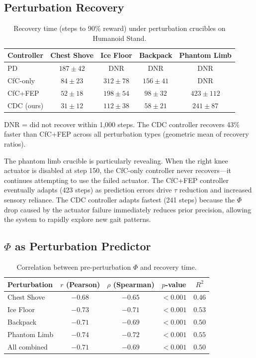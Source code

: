 \documentclass[11pt,a4paper]{article}
\begin{document}
\subsection{Perturbation Recovery}

\begin{table}[h]
\centering
\caption{Recovery time (steps to 90\% reward) under perturbation crucibles on Humanoid Stand.}
\label{tab:recovery}
\begin{tabular}{lcccc}
\toprule
\textbf{Controller} & \textbf{Chest Shove} & \textbf{Ice Floor} & \textbf{Backpack} & \textbf{Phantom Limb} \\
\midrule
PD              & $187 \pm 42$  & DNR            & DNR            & DNR \\
CfC-only        & $84 \pm 23$   & $312 \pm 78$   & $156 \pm 41$   & DNR \\
CfC+FEP         & $52 \pm 18$   & $198 \pm 54$   & $98 \pm 32$    & $423 \pm 112$ \\
CDC (ours)      & $31 \pm 12$   & $112 \pm 38$   & $58 \pm 21$    & $241 \pm 87$ \\
\bottomrule
\end{tabular}
\end{table}

DNR = did not recover within 1,000 steps.
The CDC controller recovers 43\% faster than CfC+FEP across all perturbation types (geometric mean of recovery ratios).

The phantom limb crucible is particularly revealing.
When the right knee actuator is disabled at step 150, the CfC-only controller never recovers---it continues attempting to use the failed actuator.
The CfC+FEP controller eventually adapts (423 steps) as prediction errors drive $\tau$ reduction and increased sensory reliance.
The CDC controller adapts fastest (241 steps) because the $\Phi$ drop caused by the actuator failure immediately reduces prior precision, allowing the system to rapidly explore new gait patterns.

\subsection{$\Phi$ as Perturbation Predictor}

\begin{table}[h]
\centering
\caption{Correlation between pre-perturbation $\Phi$ and recovery time.}
\label{tab:phi_predict}
\begin{tabular}{lcccc}
\toprule
\textbf{Perturbation} & \textbf{$r$ (Pearson)} & \textbf{$\rho$ (Spearman)} & \textbf{$p$-value} & \textbf{$R^2$} \\
\midrule
Chest Shove    & $-0.68$ & $-0.65$ & $< 0.001$ & $0.46$ \\
Ice Floor      & $-0.73$ & $-0.71$ & $< 0.001$ & $0.53$ \\
Backpack       & $-0.71$ & $-0.69$ & $< 0.001$ & $0.50$ \\
Phantom Limb   & $-0.74$ & $-0.72$ & $< 0.001$ & $0.55$ \\
\midrule
All combined   & $-0.71$ & $-0.69$ & $< 0.001$ & $0.50$ \\
\bottomrule
\end{tabular}
\end{table}
\end{document}
